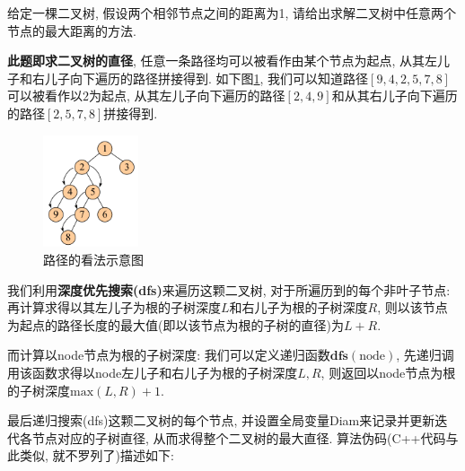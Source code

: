 \documentclass{article}
\begin{document}
\begin{homeworkProblem}
	给定一棵二叉树, 假设两个相邻节点之间的距离为1, 请给出求解二叉树中任意两个节点的最大距离的方法.

	\solution \textbf{此题即求二叉树的直径}, 任意一条路径均可以被看作由某个节点为起点, 从其左儿子和右儿子向下遍历的路径拼接得到. 如下图\ref{fig:路径的看法示意图}, 我们可以知道路径$[9,4,2,5,7,8]$可以被看作以$2$为起点, 从其左儿子向下遍历的路径$[2,4,9]$和从其右儿子向下遍历的路径$[2,5,7,8]$拼接得到.
	\begin{figure}[H]  %
		\centering
		\includegraphics[width=0.25\textwidth]{images/title/二叉树直径.pdf}
		\caption{路径的看法示意图}
		\label{fig:路径的看法示意图}
	\end{figure}
	
	我们利用\textbf{深度优先搜索(dfs)}来遍历这颗二叉树, 对于所遍历到的每个非叶子节点: 再计算求得以其左儿子为根的子树深度$L$和右儿子为根的子树深度$R$, 则以该节点为起点的路径长度的最大值(即以该节点为根的子树的直径)为$L+R$. 
	
	而计算以node节点为根的子树深度: 我们可以定义递归函数$\textbf{dfs}(\text{node})$, 先递归调用该函数求得以node左儿子和右儿子为根的子树深度$L,R$, 则返回以node节点为根的子树深度$\text{max}(L,R)+1$.

	最后递归搜索(dfs)这颗二叉树的每个节点, 并设置全局变量Diam来记录并更新迭代各节点对应的子树直径, 从而求得整个二叉树的最大直径. 算法伪码(C++代码与此类似, 就不罗列了)描述如下:


\end{homeworkProblem}
\end{document}
